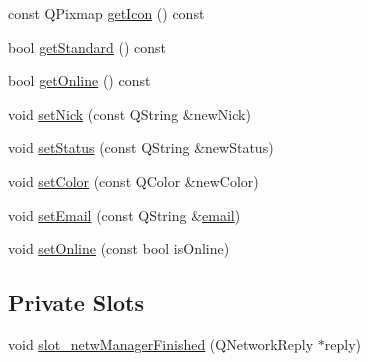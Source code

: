 \begin{DoxyCompactItemize}
\item 
const Q\-Pixmap \hyperlink{classclient_1_1irc_user_a521a4df549ad0e80df8ef739d168a917}{get\-Icon} () const 
\item 
bool \hyperlink{classclient_1_1irc_user_a6a361f6ed53e82efe4e442db7023ae49}{get\-Standard} () const 
\item 
bool \hyperlink{classclient_1_1irc_user_af60811d51ad2e145727c0d6689f3bb8b}{get\-Online} () const 
\item 
void \hyperlink{classclient_1_1irc_user_afea3839060b77227e83a0f84067a680d}{set\-Nick} (const Q\-String \&new\-Nick)
\item 
void \hyperlink{classclient_1_1irc_user_a0e73c2523b27cd4aeef5b85af753ed26}{set\-Status} (const Q\-String \&new\-Status)
\item 
void \hyperlink{classclient_1_1irc_user_a244bb548bf70054af24e540bfe10ef48}{set\-Color} (const Q\-Color \&new\-Color)
\item 
void \hyperlink{classclient_1_1irc_user_a07931060901d4ce55fd76c1533e1376f}{set\-Email} (const Q\-String \&\hyperlink{classclient_1_1irc_user_a6bdc381efdca6c1ab4bd4bdc3bcb4bb9}{email})
\item 
void \hyperlink{classclient_1_1irc_user_a3ba95d7e1584d9004b449494a62302a3}{set\-Online} (const bool is\-Online)
\end{DoxyCompactItemize}
\subsection*{Private Slots}
\begin{DoxyCompactItemize}
\item 
void \hyperlink{classclient_1_1irc_user_a10dddba7236ce4577fd11eb906005d55}{slot\-\_\-netw\-Manager\-Finished} (Q\-Network\-Reply $\ast$reply)
\end{DoxyCompactItemize}
